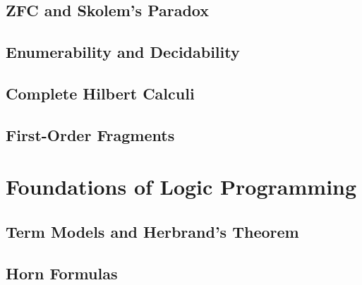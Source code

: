 

\subsection{{\sf ZFC} and Skolem's Paradox}



\subsection{Enumerability and Decidability}



\subsection{Complete Hilbert Calculi}



\subsection{First-Order Fragments}



\vfill\break

\section{Foundations of Logic Programming}

\subsection{Term Models and Herbrand's Theorem}



\subsection{Horn Formulas}



%
%

